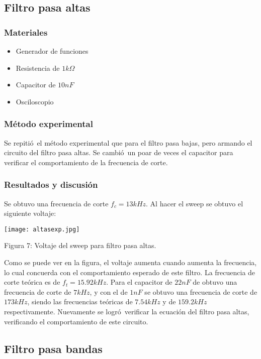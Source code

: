 \documentclass[11pt]{article}
\renewcommand{\=}[1]{\stackrel{#1}{=}} %
\theoremstyle{definition}
\theoremstyle{remark}
\begin{document}
\subsection{Filtro pasa altas}
\subsubsection{Materiales}
\begin{itemize}
\item Generador de funciones
\item Resistencia de $1k\Omega$
\item Capacitor de $10nF$
\item Osciloscopio
\end{itemize}

\subsubsection{M\'etodo experimental}
Se repiti\'o\ el m\'etodo experimental que para el filtro pasa bajas, pero armando el circuito del filtro pasa altas. Se cambi\'o\ un poar de veces el capacitor para verificar el comportamiento de la frecuencia de corte.

\subsubsection{Resultados y discusi\'on}
Se obtuvo una frecuencia de corte $f_c=13kHz$. Al hacer el sweep se obtuvo el siguiente voltaje:
\begin{center}
\texttt{[image: altasexp.jpg]}
\end{center}
\begin{center}
Figura 7: Voltaje del sweep para filtro pasa altas.
\end{center}
Como se puede ver en la figura, el voltaje aumenta cuando aumenta la frecuencia, lo cual concuerda con el comportamiento esperado de este filtro. La frecuencia de corte te\'orica es de $f_t=15.92kHz$. Para el capacitor de $22nF$ de obtuvo una frecuencia de corte de $7kHz$, y con el de $1nF$ se obtuvo una frecuencia de corte de $173kHz$, siendo las frecuencias te\'oricas de $7.54kHz$ y de $159.2kHz$ respectivamente. Nuevamente se logr\'o\ verificar la ecuaci\'on del filtro pasa altas, verificando el comportamiento de este circuito.

\subsection{Filtro pasa bandas}
\end{document}
